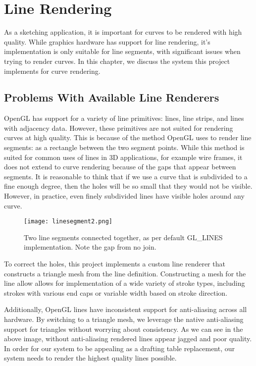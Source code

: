 \chapter{Line Rendering}

As a sketching application, it is important for curves to be rendered with high quality.
While graphics hardware has support for line rendering, it's implementation is only suitable for line segments, with significant issues when trying to render curves.
In this chapter, we discuss the system this project implements for curve rendering.

\section{Problems With Available Line Renderers}
OpenGL has support for a variety of line primitives: lines, line strips, and lines with adjacency data.
However, these primitives are not suited for rendering curves at high quality.
This is because of the method OpenGL uses to render line segments: as a rectangle between the two segment points.
While this method is suited for common uses of lines in 3D applications, for example wire frames, it does not extend to curve rendering because of the gaps that appear between segments.
It is reasonable to think that if we use a curve that is subdivided to a fine enough degree, then the holes will be so small that they would not be visible.
However, in practice, even finely subdivided lines have visible holes around any curve.

\begin{figure}
	\texttt{[image: linesegment2.png]}
	\caption{Two line segments connected together, as per default GL\_LINES implementation. Note the gap from no join.}
\end{figure}

To correct the holes, this project implements a custom line renderer that constructs a triangle mesh from the line definition.
Constructing a mesh for the line allow allows for implementation of a wide variety of stroke types, including strokes with various end caps or variable width based on stroke direction. 

Additionally, OpenGL lines have inconsistent support for anti-aliasing across all hardware.
By switching to a triangle mesh, we leverage the native anti-aliasing support for triangles without worrying about consistency.
As we can see in the above image, without anti-aliasing rendered lines appear jagged and poor quality.
In order for our system to be appealing as a drafting table replacement, our system needs to render the highest quality lines possible.

